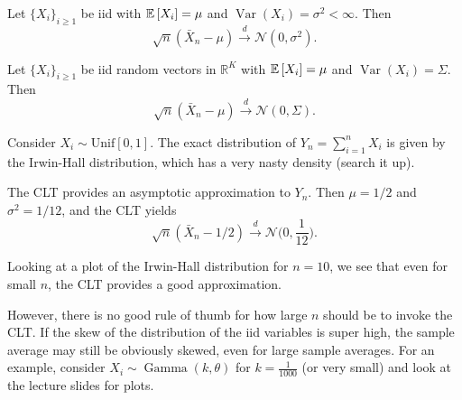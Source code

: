 \begin{theorem}
	Let $\{X_i\}_{i\ge 1}$ be iid with $\mathbb{E}\left[X_i\right]=\mu$ and $\operatorname{Var}(X_i)=\sigma^2<\infty$. Then
	\[
		\sqrt{n}(\bar X_n-\mu)\xrightarrow{d}\mathcal{N}(0,\sigma^2).
	\]
\end{theorem}
\begin{theorem}
	Let $\{X_i\}_{i\ge 1}$ be iid random vectors in $\mathbb{R}^K$ with $\mathbb{E}\left[X_i\right]=\mu$ and $\operatorname{Var}(X_i)=\Sigma$. Then
	\[
		\sqrt{n}(\bar X_n-\mu)\xrightarrow{d}\mathcal{N}(0,\Sigma).
	\]
\end{theorem}

\begin{remark}	Consider $X_i\sim \text{Unif}[0,1]$. The exact distribution of $Y_n = \sum_{i=1}^{n}X_i$ is given by the Irwin-Hall distribution, which has a very nasty density (search it up).

	The CLT provides an asymptotic approximation to $Y_n$. Then $\mu=1/2$ and $\sigma^2=1/12$, and the CLT yields
	\[
		\sqrt{n}(\bar X_n-1/2)\xrightarrow{d}\mathcal{N}\Big(0,\frac{1}{12}\Big).
	\]

	Looking at a plot of the Irwin-Hall distribution for $n=10$, we see that even for small $n$, the CLT provides a good approximation.

	However, there is no good rule of thumb for how large $n$ should be to invoke the CLT. If the skew of the distribution of the iid variables is super high, the sample average may still be obviously skewed, even for large sample averages. For an example, consider $X_i \sim \operatorname{Gamma}(k,\theta)$ for $k = \frac{1}{1000}$ (or very small) and look at the lecture slides for plots.
\end{remark}

